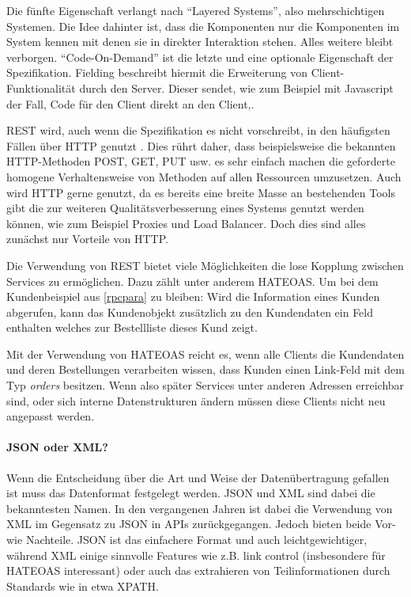 \documentclass[12pt,a4paper,bibliography=totocnumbered,listof=totocnumbered]{scrartcl}
\begin{document}
Die fünfte Eigenschaft verlangt nach \enquote{Layered Systems}, also mehrschichtigen Systemen. Die Idee dahinter ist, dass die Komponenten nur die Komponenten im System kennen mit denen sie in direkter Interaktion stehen. Alles weitere bleibt verborgen.
\enquote{Code-On-Demand} ist die letzte und eine optionale Eigenschaft der Spezifikation. Fielding beschreibt hiermit die Erweiterung von Client-Funktionalität durch den Server. Dieser sendet, wie zum Beispiel mit Javascript der Fall, Code für den Client direkt an den Client,.\cite{fielding}

REST wird, auch wenn die Spezifikation es nicht vorschreibt, in den häufigsten Fällen über HTTP genutzt \cite[S.97]{buildingms}. Dies rührt daher, dass beispielsweise die bekannten HTTP-Methoden POST, GET, PUT usw. es sehr einfach machen die geforderte homogene Verhaltensweise von Methoden auf allen Ressourcen umzusetzen. Auch wird HTTP gerne genutzt, da es bereits eine breite Masse an bestehenden Tools gibt die zur weiteren Qualitätsverbesserung eines Systems genutzt werden können, wie zum Beispiel Proxies und Load Balancer. Doch dies sind alles zunächst nur Vorteile von HTTP.

Die Verwendung von REST bietet viele Möglichkeiten die lose Kopplung zwischen Services zu ermöglichen. Dazu zählt unter anderem \ac{HATEOAS}. Um bei dem Kundenbeispiel aus \ref{rpcpara} zu bleiben: Wird die Information eines Kunden abgerufen, kann das Kundenobjekt zusätzlich zu den Kundendaten ein Feld enthalten welches zur Bestellliste dieses Kund zeigt.



Mit der Verwendung von HATEOAS reicht es, wenn alle Clients die Kundendaten und deren Bestellungen verarbeiten wissen, dass Kunden einen Link-Feld mit dem Typ \textit{orders} besitzen. Wenn also später Services unter anderen Adressen erreichbar sind, oder sich interne Datenstrukturen ändern müssen diese Clients nicht neu angepasst werden.

\paragraph{JSON oder XML?} 

Wenn die Entscheidung über die Art und Weise der Datenübertragung gefallen ist muss das Datenformat festgelegt werden. JSON und XML sind dabei die bekanntesten Namen. In den vergangenen Jahren ist dabei die Verwendung von XML im Gegensatz zu JSON in \ac{API}s zurückgegangen\cite{duvander2}. Jedoch bieten beide Vor- wie Nachteile. JSON ist das einfachere Format und auch leichtgewichtiger, während XML einige sinnvolle Features wie z.B. link control (insbesondere für HATEOAS interessant) oder auch das extrahieren von Teilinformationen durch Standards wie in etwa XPATH\cite[S.101]{buildingms}.
\end{document}
